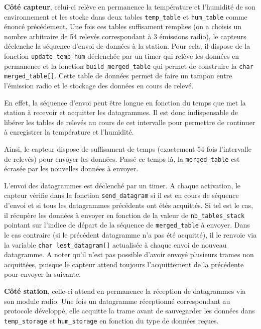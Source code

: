 \documentclass[a4paper]{article}
\begin{document}
\textbf{Côté capteur}, celui-ci relève en permanence la température et l'humidité de son environnement et les stocke dans deux tables 
\texttt{temp\_table} et \texttt{hum\_table} comme énoncé précédement. 
Une fois ces tables suffisament remplies (on a choisis un nombre arbitraire de 54 relevés correspondant à 3 émissions radio), 
le capteurs déclenche la séquence d'envoi de données à la station. 
Pour cela, il dispose de la fonction \texttt{update\_temp\_hum} déclenchée par un timer qui relève les données 
en permanence et la fonction \texttt{build\_merged\_table} qui permet de construire la \texttt{char merged\_table[]}. 
Cette table de données permet de faire un tampon entre l'émission radio et le stockage des données en cours de relevé. 

En effet, la séquence d'envoi peut être longue en fonction du temps que met la station à recevoir et acquitter les datagrammes. 
Il est donc indispensable de libérer les tables de relevés au cours de cet intervalle pour permettre de continuer 
à enregistrer la température et l'humidité. 

Ainsi, le capteur dispose de suffisament de temps (exactement 54 fois l'intervalle de relevés) pour envoyer les données. 
Passé ce temps là, la \texttt{merged\_table} est écrasée par les nouvelles données à envoyer. 

L'envoi des datagrammes est déclenché par un timer. A chaque activation, le capteur vérifie dans la fonction 
\texttt{send\_datagram} si il est en cours de séquence d'envoi et si tous les datagrammes précédents ont étés acquittés. 
Si tel est le cas, il récupère les données à envoyer en fonction de la valeur de \texttt{nb\_tables\_stack} pointant sur 
l'indice de départ de la séquence de \texttt{merged\_table} à envoyer. 
Dans le cas contraire (si le précédent datagramme n'a pas été acquitté), il le renvoie via la variable \texttt{char lest\_datagram[]}
actualisée à chaque envoi de nouveau datagramme. 
A noter qu'il n'est pas possible d'avoir envoyé plusieurs trames non acquittées, puisque le capteur attend toujours l'acquittement 
de la précédente pour envoyer la suivante. 

\vspace{0.3cm}

\textbf{Côté station}, celle-ci attend en permanence la réception de datagrammes via son module radio. 
Une fois un datagramme réceptionné correspondant au protocole développé, elle acquitte la trame avant 
de sauvegarder les données dans \texttt{temp\_storage} et \texttt{hum\_storage} en fonction du type de données reçues. 
\end{document}
